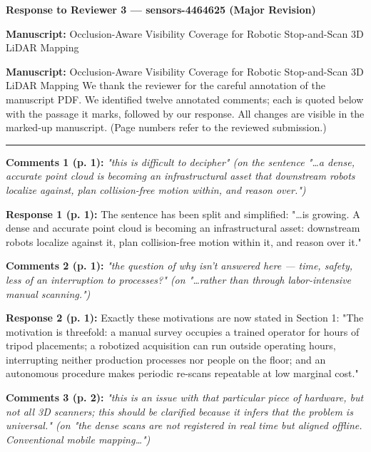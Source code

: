 \documentclass[11pt]{article}
\begin{document}
\begin{center}\LARGE\bfseries Response to Reviewer 3 — sensors-4464625 (Major Revision)\end{center}

\textbf{Manuscript:} Occlusion-Aware Visibility Coverage for Robotic Stop-and-Scan 3D LiDAR Mapping

\textbf{Manuscript:} Occlusion-Aware Visibility Coverage for Robotic Stop-and-Scan 3D LiDAR Mapping
We thank the reviewer for the careful annotation of the manuscript PDF. We identified twelve annotated comments; each is quoted below with the passage it marks, followed by our response. All changes are visible in the marked-up manuscript. (Page numbers refer to the reviewed submission.)

\medskip\hrule\medskip

\textbf{Comments 1 (p. 1):} \emph{"this is difficult to decipher" \emph{(on the sentence "…a dense, accurate point cloud is becoming an infrastructural asset that downstream robots localize against, plan collision-free motion within, and reason over.")}}

\textbf{Response 1 (p. 1):} The sentence has been split and simplified: "…is growing. A dense and accurate point cloud is becoming an infrastructural asset: downstream robots localize against it, plan collision-free motion within it, and reason over it."

\medskip

\textbf{Comments 2 (p. 1):} \emph{"the question of why isn't answered here — time, safety, less of an interruption to processes?" \emph{(on "…rather than through labor-intensive manual scanning.")}}

\textbf{Response 2 (p. 1):} Exactly these motivations are now stated in Section 1: "The motivation is threefold: a manual survey occupies a trained operator for hours of tripod placements; a robotized acquisition can run outside operating hours, interrupting neither production processes nor people on the floor; and an autonomous procedure makes periodic re-scans repeatable at low marginal cost."

\medskip

\textbf{Comments 3 (p. 2):} \emph{"this is an issue with that particular piece of hardware, but not all 3D scanners; this should be clarified because it infers that the problem is universal." \emph{(on "the dense scans are not registered in real time but aligned offline. Conventional mobile mapping…")}}
\end{document}
